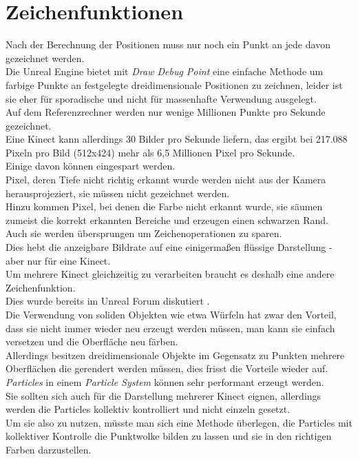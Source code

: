 \documentclass[a4paper]{IEEEtran}
\begin{document}
\section{Zeichenfunktionen}
	Nach der Berechnung der Positionen muss nur noch ein Punkt an jede davon gezeichnet werden. \\
	Die Unreal Engine bietet mit {\textit{Draw Debug Point}} eine einfache Methode um farbige Punkte an festgelegte dreidimensionale Positionen zu zeichnen, leider ist sie eher für sporadische und nicht für massenhafte Verwendung ausgelegt. \\
	Auf dem Referenzrechner werden nur wenige Millionen Punkte pro Sekunde gezeichnet. \\
	Eine Kinect kann allerdings 30 Bilder pro Sekunde liefern, das ergibt bei 217.088 Pixeln pro Bild (512x424) mehr als 6,5 Millionen Pixel pro Sekunde. \\
	Einige davon können eingespart werden. \\
	Pixel, deren Tiefe nicht richtig erkannt wurde werden nicht aus der Kamera herausprojeziert, sie müssen nicht gezeichnet werden. \\
	Hinzu kommen Pixel, bei denen die Farbe nicht erkannt wurde, sie säumen zumeist die korrekt erkannten Bereiche und erzeugen einen schwarzen Rand. \\
	Auch sie werden übersprungen um Zeichenoperationen zu sparen. \\
	Dies hebt die anzeigbare Bildrate auf eine einigermaßen flüssige Darstellung - aber nur für eine Kinect. \\
	Um mehrere Kinect gleichzeitig zu verarbeiten braucht es deshalb eine andere Zeichenfunktion.\\
	Dies wurde bereits im Unreal Forum diskutiert {\cite{lidar}}.\\
	Die Verwendung von soliden Objekten wie etwa Würfeln hat zwar den Vorteil, dass sie nicht immer wieder neu erzeugt werden müssen, man kann sie einfach versetzen und die Oberfläche neu färben. \\
	Allerdings besitzen dreidimensionale Objekte im Gegensatz zu Punkten mehrere Oberflächen die gerendert werden müssen, dies frisst die Vorteile wieder auf.\\
	{\textit{Particles}} in einem {\textit{Particle System}} können sehr performant erzeugt werden. \\
	Sie sollten sich auch für die Darstellung mehrerer Kinect eignen, allerdings werden die Particles kollektiv kontrolliert und nicht einzeln gesetzt. \\
	Um sie also zu nutzen, müsste man sich eine Methode überlegen, die Particles mit kollektiver Kontrolle die Punktwolke bilden zu lassen und sie in den richtigen Farben darzustellen. \\[0.5cm]
	
\end{document}
